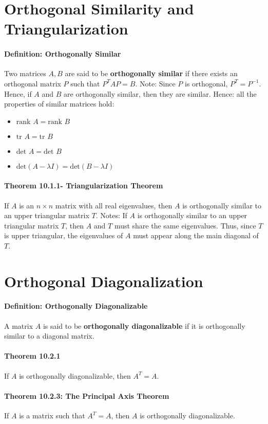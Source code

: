 \documentclass[10pt,letter]{article}
\begin{document}
\section*{Orthogonal Similarity and Triangularization}
\paragraph{Definition: Orthogonally Similar}
Two matrices $A,B$ are said to be \textbf{orthogonally similar} if there exists an orthogonal matrix $P$ such that $P^TAP=B$. Note: Since $P$ is orthogonal, $P^T=P^{-1}$. Hence, if $A$ and $B$ are orthogonally similar, then they are similar. Hence: all the properties of similar matrices hold: \begin{itemize}
    \item $\text{rank }A=\text{rank }B$
    \item $\text{tr }A=\text{tr }B$
    \item $\text{det }A=\text{det }B$ 
    \item $\text{det}(A-\lambda I)=\text{det}(B-\lambda I)$
\end{itemize}

\paragraph{Theorem 10.1.1- Triangularization Theorem} 
If $A$ is an $n\times n$ matrix with all real eigenvalues, then $A$ is orthogonally similar to an upper triangular matrix $T$. Notes: If $A$ is orthogonally similar to an upper triangular matrix $T$, then $A$ and $T$ must share the same eigenvalues. Thus, since $T$ is upper triangular, the eigenvalues of $A$ must appear along the main diagonal of $T$. 

\section*{Orthogonal Diagonalization}
\paragraph{Definition: Orthogonally Diagonalizable}
A matrix $A$ is said to be \textbf{orthogonally diagonalizable} if it is orthogonally similar to a diagonal matrix. 
\paragraph{Theorem 10.2.1}
If $A$ is orthogonally diagonalizable, then $A^T=A$. 
\paragraph{Theorem 10.2.3: The Principal Axis Theorem}
If $A$ is a matrix such that $A^T=A$, then $A$ is orthogonally diagonalizable. 
\end{document}
